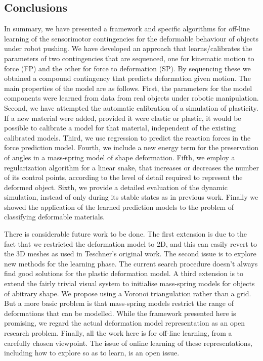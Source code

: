 \documentclass[journal]{IEEEtran}
\newcounter{algorithm}
\begin{document}
\subsection{Conclusions}
In summary, we have presented a framework and specific algorithms for off-line learning of the sensorimotor contingencies for the deformable behaviour of objects under robot pushing. We have developed an approach that learns/calibrates the parameters of two contingencies that are sequenced, one for kinematic motion to force (FP) and the other for force to deformation (SP). By sequencing these we obtained a compound contingency that predicts deformation given motion. The main properties of the model are as follows. First, the parameters for the model components were learned from data from real objects under robotic manipulation. Second, we have attempted the automatic calibration of a simulation of plasticity. If a new material were added, provided it were elastic or plastic, it would be possible to calibrate a model for that material, independent of the existing calibrated models. Third, we use regression to predict the reaction forces in the force prediction model. Fourth, we include a new energy term for the preservation of angles in a mass-spring model of shape deformation. Fifth, we employ a regularization algorithm for a linear snake, that increases or decreases the number of its control points, according to the level of detail required to represent the deformed object. Sixth, we provide a detailed evaluation of the dynamic simulation, instead of only during its stable states as in previous work. Finally we showed the application of the learned prediction models to the problem of classifying deformable materials.

There is considerable future work to be done. The first extension is due to the fact that we restricted the deformation model to 2D, and this can easily revert to the 3D meshes as used in Teschner's original work. The second issue is to explore new methods for the learning phase. The current search procedure doesn't always find good solutions for the plastic deformation model. A third extension is to extend the fairly trivial visual system to initialise mass-spring models for objects of abitrary shape. We propose using a Voronoi triangulation rather than a grid. But a more basic problem is that mass-spring models restrict the range of deformations that can be modelled. While the framework presented here is promising, we regard the actual deformation model representation as an open research problem. Finally, all the work here is for off-line learning, from a carefully chosen viewpoint. The issue of online learning of these representations, including how to explore so as to learn, is an open issue.
\end{document}
